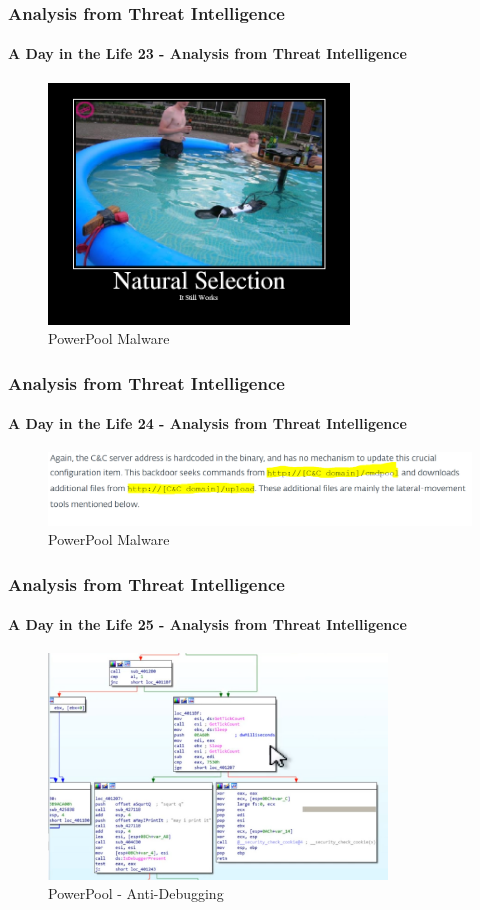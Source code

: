 \documentclass[aspectratio=169]{beamer}
\begin{document}
\begin{frame}
  \frametitle{Analysis from Threat Intelligence}
  \framesubtitle{A Day in the Life 23 - Analysis from Threat Intelligence}
  \begin{center}
    \begin{figure}
      \includegraphics[width=8cm,keepaspectratio]{powerpool_meme}
      \caption{PowerPool Malware}
    \end{figure}
  \end{center}
\end{frame}

\begin{frame}
  \frametitle{Analysis from Threat Intelligence}
  \framesubtitle{A Day in the Life 24 - Analysis from Threat Intelligence}
  \begin{center}
    \begin{figure}
      \includegraphics[width=14cm,keepaspectratio]{powerpool_article}
      \caption{PowerPool Malware}
    \end{figure}
  \end{center}
\end{frame}

\begin{frame}
  \frametitle{Analysis from Threat Intelligence}
  \framesubtitle{A Day in the Life 25 - Analysis from Threat Intelligence}
  \begin{center}
    \begin{figure}
      \includegraphics[width=9cm,keepaspectratio]{powerpool_anti_debug}
      \caption{PowerPool - Anti-Debugging}
    \end{figure}
  \end{center}
\end{frame}
\end{document}
